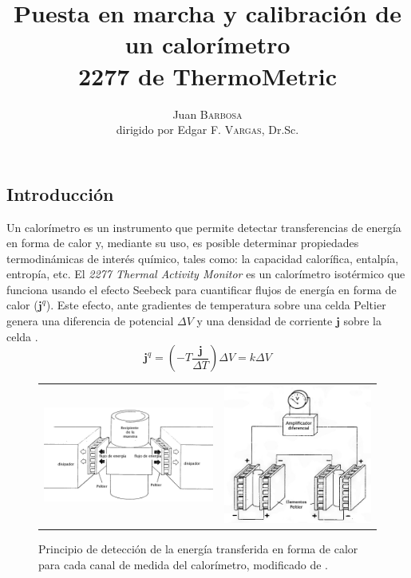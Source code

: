 \documentclass[a0]{sciposter}
\title{Puesta en marcha y calibración de un	calorímetro\\ 2277 de ThermoMetric}
\author{Juan \textsc{Barbosa}\\dirigido por Edgar F. \textsc{Vargas}, Dr.Sc.}
\institute 
{Departamento de Qu\'imica\\
	Universidad de los Andes\\
	Cra 1 N$^\circ$ 18A - 12 Bogotá, Colombia}
\begin{document}
\maketitle

\begin{multicols}{3}

\section{Introducci\'on}
	Un calorímetro es un instrumento que permite detectar transferencias de energ\'ia en forma de calor y, mediante su uso, es posible determinar propiedades termodinámicas de interés químico, tales como: la capacidad calorífica, entalpía, entropía, etc. El \textit{2277 Thermal Activity Monitor} es un calorímetro isotérmico que funciona usando el efecto Seebeck para cuantificar flujos de energía en forma de calor ($\mathbf{j}^q$). Este efecto, ante gradientes de temperatura sobre una celda Peltier genera una diferencia de potencial $\Delta V$ y una densidad de corriente $\mathbf{j}$ sobre la celda \cite{simon2013oxford}.
	\begin{equation}\label{eq: peltier}
		\mathbf{j}^q = \left(-T\dfrac{\mathbf{j}}{\Delta T}\right)\Delta V = k\Delta V
	\end{equation}
	
	\begin{figure}[h]
		\centering
		\begin{tabular}{cc}
			\includegraphics[width=0.59\linewidth]{../Tesis/Figures/heatFlow} & 
			\includegraphics[width=0.39\linewidth]{../Tesis/Figures/twinMeasuring}
		\end{tabular}
		\caption{Principio de detecci\'on de la energ\'ia transferida en forma de calor para cada canal de medida del calor\'imetro, modificado de \cite{Suurkuusk}.}
	\end{figure}


\end{multicols}
\end{document}
